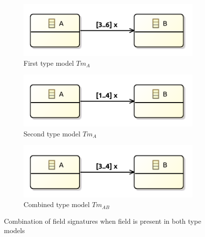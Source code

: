 \begin{figure}
    \centering
    \begin{subfigure}{0.45\textwidth}
        \centering
        \includegraphics{images/04_transformation_framework/type_models_combination/fieldsig_combine_tmod1.pdf}
        \caption{First type model $Tm_A$}
        \label{fig:transformation_framework:type_models_and_type_graphs:combining_type_models:fieldsig_combine_tmod1}
    \end{subfigure}
    \begin{subfigure}{0.45\textwidth}
        \centering
        \includegraphics{images/04_transformation_framework/type_models_combination/fieldsig_combine_tmod2.pdf}
        \caption{Second type model $Tm_A$}
        \label{fig:transformation_framework:type_models_and_type_graphs:combining_type_models:fieldsig_combine_tmod2}
    \end{subfigure}
    \par\medskip
    \begin{subfigure}{\textwidth}
        \centering
        \includegraphics{images/04_transformation_framework/type_models_combination/fieldsig_combine_tmod12.pdf}
        \caption{Combined type model $Tm_{AB}$}
        \label{fig:transformation_framework:type_models_and_type_graphs:combining_type_models:fieldsig_combine_tmod12}
    \end{subfigure}
    \caption{Combination of field signatures when field is present in both type models}
    \label{fig:transformation_framework:type_models_and_type_graphs:combining_type_models:fieldsig_combine}
\end{figure}

